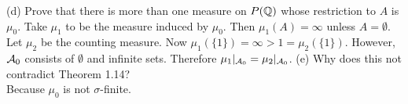\begin{enumerate}
 \subitem(d) Prove that there is more than one measure on $P({\mathbb Q})$ whose restriction to $A$ is $\mu_0$.
Take $\mu_1$ to be the measure induced by $\mu_0$. Then $\mu_1(A)=\infty$ unless $A=\emptyset$. Let $\mu_2$ be the counting measure. Now $\mu_1(\{1\})=\infty >1=\mu_2(\{1\})$. However, ${{\mathcal A}}_0$ consists of $\emptyset$ and infinite sets. Therefore $\mu_1|_{{{\mathcal A}}_0}=\mu_2|_{{{\mathcal A}}_0}$. 
 \subitem(e) Why does this not contradict Theorem 1.14?\\
Because $\mu_0$ is not $\sigma$-finite. 
\end{enumerate}

